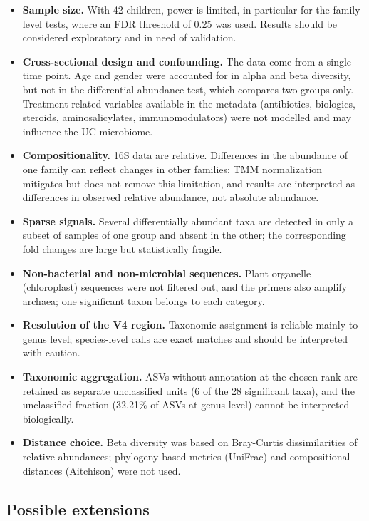 \documentclass[
  letterpaper,
  DIV=11,
  numbers=noendperiod]{scrartcl}
\providecommand{\tightlist}{%
  \setlength{\itemsep}{0pt}\setlength{\parskip}{0pt}}
\begin{document}
\begin{itemize}
\tightlist
\item
  \textbf{Sample size.} With 42 children, power is limited, in
  particular for the family-level tests, where an FDR threshold of 0.25
  was used. Results should be considered exploratory and in need of
  validation.
\item
  \textbf{Cross-sectional design and confounding.} The data come from a
  single time point. Age and gender were accounted for in alpha and beta
  diversity, but not in the differential abundance test, which compares
  two groups only. Treatment-related variables available in the metadata
  (antibiotics, biologics, steroids, aminosalicylates, immunomodulators)
  were not modelled and may influence the UC microbiome.
\item
  \textbf{Compositionality.} 16S data are relative. Differences in the
  abundance of one family can reflect changes in other families; TMM
  normalization mitigates but does not remove this limitation, and
  results are interpreted as differences in observed relative abundance,
  not absolute abundance.
\item
  \textbf{Sparse signals.} Several differentially abundant taxa are
  detected in only a subset of samples of one group and absent in the
  other; the corresponding fold changes are large but statistically
  fragile.
\item
  \textbf{Non-bacterial and non-microbial sequences.} Plant organelle
  (chloroplast) sequences were not filtered out, and the primers also
  amplify archaea; one significant taxon belongs to each category.
\item
  \textbf{Resolution of the V4 region.} Taxonomic assignment is reliable
  mainly to genus level; species-level calls are exact matches and
  should be interpreted with caution.
\item
  \textbf{Taxonomic aggregation.} ASVs without annotation at the chosen
  rank are retained as separate unclassified units (6 of the 28
  significant taxa), and the unclassified fraction (32.21\% of ASVs at
  genus level) cannot be interpreted biologically.
\item
  \textbf{Distance choice.} Beta diversity was based on Bray-Curtis
  dissimilarities of relative abundances; phylogeny-based metrics
  (UniFrac) and compositional distances (Aitchison) were not used.
\end{itemize}

\subsection{Possible extensions}\label{possible-extensions}
\end{document}
